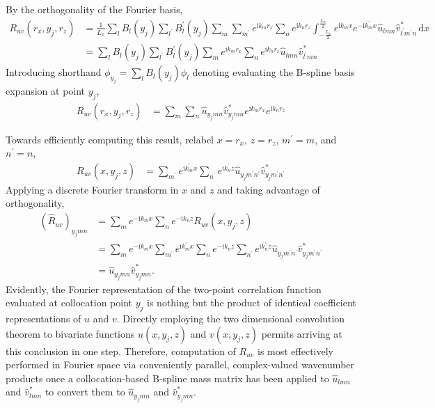 \documentclass[letterpaper,11pt,nointlimits,reqno]{amsart}
\newcommand{\ii}{\ensuremath{\mathrm{i}}}
\begin{document}
By the orthogonality of the Fourier basis,
\begin{align}
R_{uv} \left( r_x, y_j, r_z \right)
  &= \frac{1}{L_x}
     \sum_{l} B_l\left(y_j\right)
     \sum_{l^\prime} B_l^\prime\left(y_j\right)
     \sum_{m}
     \sum_{m^\prime}
     e^{\ii k_m r_x}
     \sum_{n}
     e^{\ii k_n r_z}
     \int_{-\frac{L_x}{2}}^{\frac{L_x}{2}}
     e^{\ii k_m x  }
     e^{-\ii k_m^\prime x}
     \hat{u}_{l m n}
     \hat{v}^\ast_{l^\prime m^\prime n}
     \,\mathrm{d}x
\\
  &= \sum_{l} B_l\left(y_j\right)
     \sum_{l^\prime} B_l^\prime\left(y_j\right)
     \sum_{m}
     e^{\ii k_m r_x}
     \sum_{n}
     e^{\ii k_n r_z}
     \hat{u}_{l m n}
     \hat{v}^\ast_{l^\prime m n}
\end{align}
Introducing shorthand $\phi_{y_j} = \sum_{l} B_l\left(y_j\right) \phi_l$
denoting evaluating the B-spline basis expansion at point $y_j$,
\begin{align}
R_{uv} \left( r_x, y_j, r_z \right)
  &=
     \sum_{m}
     \sum_{n}
     \hat{u}_{y_j m n}
     \hat{v}^\ast_{y_j m n}
     e^{\ii k_m r_x}
     e^{\ii k_n r_z}
  \label{eq:twopoint_physical_xz}
\end{align}

Towards efficiently computing this result, relabel $x = r_x$, $z = r_z$,
$m^\prime = m$, and $n^\prime = n$,
\begin{align}
R_{uv} \left( x, y_j, z \right)
  &=
     \sum_{m^\prime}
     e^{\ii k_m^\prime x}
     \sum_{n^\prime}
     e^{\ii k_n^\prime z}
     \hat{u}_{y_j m^\prime n^\prime}
     \hat{v}^\ast_{y_j m^\prime n^\prime}
\end{align}
Applying a discrete Fourier transform in $x$ and $z$ and taking advantage of
orthogonality,
\begin{align}
     \left(\hat{R}_{uv}\right)_{y_j m n}
  &=
     \sum_{m}
     e^{-\ii k_m x}
     \sum_{n}
     e^{-\ii k_n z}
     R_{uv} \left( x, y_j, z \right)
\\
  &=
     \sum_{m}
     e^{-\ii k_m x}
     \sum_{m^\prime}
     e^{\ii k_m^\prime x}
     \sum_{n}
     e^{-\ii k_n z}
     \sum_{n^\prime}
     e^{\ii k_n^\prime z}
     \hat{u}_{y_j m^\prime n^\prime}
     \hat{v}^\ast_{y_j m^\prime n^\prime}
\\
  &=
     \hat{u}_{y_j m n}
     \hat{v}^\ast_{y_j m n}
  .
\end{align}
Evidently, the Fourier representation of the two-point correlation function
evaluated at collocation point $y_j$ is nothing but the product of identical
coefficient representations of $u$ and $v$.  Directly employing the two
dimensional convolution theorem to bivariate functions $u(x, y_j, z)$ and $v(x,
y_j, z)$ permits arriving at this conclusion in one step.  Therefore,
computation of $R_{uv}$ is most effectively performed in Fourier space via
conveniently parallel, complex-valued wavenumber products once a
collocation-based B-spline mass matrix has been applied to $\hat{u}_{lmn}$ and
$\hat{v}^\ast_{lmn}$ to convert them to $\hat{u}_{y_j m n}$ and
$\hat{v}^\ast_{y_j m n}$.
\end{document}
